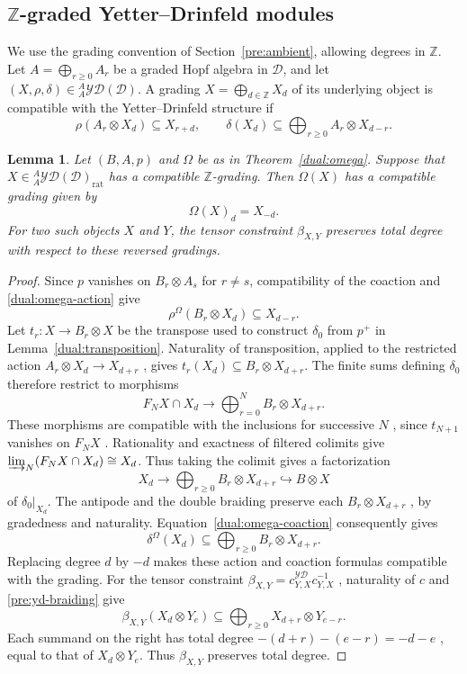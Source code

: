 \documentclass[11pt, a4paper]{article}
\numberwithin{equation}{section}
\newcommand{\D}{\mathcal D}
\newcommand{\YD}{\mathcal{YD}}
\newcommand{\rat}{\mathrm{rat}}
\newtheorem{lemma}[theorem]{Lemma}
\begin{document}
\subsection{\texorpdfstring{$\mathbb{Z}$-graded Yetter--Drinfeld modules}
{Z-graded Yetter--Drinfeld modules}}

 {We use} the grading  { convention of Section~\ref{pre:ambient},
allowing degrees in} $  \mathbb Z   $.
Let $A=  \bigoplus_{r\geq0}   A_r$ be a graded Hopf algebra in $\D$,
and let $(X,\rho,\delta)\in{}_A^A\YD(\D)$.
 {A} grading $X=\bigoplus_{d\in\mathbb Z}X_d$  {of its underlying
object is {compatible}} with the Yetter--Drinfeld structure if
\[
 \rho(A_r\otimes X_d)\subseteq X_{r+d},
 \qquad
 \delta(X_d)\subseteq
 \bigoplus_{r\geq0}A_r\otimes X_{d-r}.
\]


\begin{lemma}\label{dual:grading}
Let $(B,A,p)$ and $\Omega$ be as in
Theorem~\ref{dual:omega}.
Suppose that $X\in{}_A^A\YD(\D)_{\rat}$ has a compatible
$\mathbb Z$-grading.
Then $\Omega(X)$ has a compatible grading given by
\[
 \Omega(X)_d=X_{-d}.
\]
For two such objects $X$ and $Y$, the tensor constraint
$\beta_{X,Y}$ preserves total degree with respect to
these reversed gradings.
\end{lemma}

\begin{proof}

Since $p$ vanishes on $B_r\otimes A_s$ for $r\neq s$,
 {compatibility of the coaction and} \eqref{dual:omega-action}  {give}
\[
 \rho^\Omega(B_r\otimes X_d)\subseteq X_{d-r}.
\]
Let $t_r:X\to B_r\otimes X$ be the  {transpose} used to
construct $\delta_0$ from $p^+$ in
Lemma~\ref{dual:transposition}.
 {Naturality of transposition, applied to the restricted} action
$A_r\otimes X_d\to X_{d+r}$ {,} gives
$t_r(X_d)\subseteq B_r\otimes X_{d+r}$.
 {The finite sums defining} $  \delta_0   $  {therefore restrict to morphisms}
\[
 F_NX\cap X_d  \longrightarrow   
 \bigoplus_{r=0}^{N}B_r\otimes X_{d+r}.
\]
 {These morphisms are compatible with the inclusions for successive}
$  N   $ {, since} $  t_{N+1}   $  {vanishes on} $  F_N   X$ {.
Rationality} and  {exactness of} filtered colimits  {give}
$\varinjlim_N(F_NX\cap X_d)\cong X_d$.
 {Thus taking} the colimit gives a  {factorization}
\[
 X_d\longrightarrow
 \bigoplus_{r\geq0}B_r\otimes X_{d+r}
   \hookrightarrow    B\otimes X
\]
of $\delta_0  |_{X_d}   $.
 {The antipode and the double braiding preserve each}
$B_r\otimes X_{d+r}$ {, by gradedness and naturality}.
 {Equation~}\eqref{dual:omega-coaction}  {consequently gives}
\[
 \delta^\Omega(X_d)\subseteq
 \bigoplus_{r\geq0}B_r\otimes X_{d+r}.
\]
Replacing  {degree} $d$ by $-d$  {makes these} action and coaction
 {formulas compatible with the grading}.
 {For} the  {tensor constraint}
$\beta_{X,Y}=c^{\YD}_{Y,X}c_{Y,X}^{-1}$ {,}
naturality  {of} $  c   $ and \eqref{pre:yd-braiding}  {give}
\[
 \beta_{X,Y}(X_d\otimes Y_e)
 \subseteq
 \bigoplus_{r\geq0}X_{d+r}\otimes Y_{e-r}.
\]
 {Each} summand on the right has   total degree
$-(d+r)-(e-r)=-d-e$ {, equal to that} of $X_d\otimes Y_e$.
 {Thus} $\beta_{X,Y}$ preserves total degree.
\end{proof}
\end{document}
